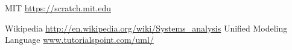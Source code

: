 \begin{thebibliography}{99999}
\singlespace\normalsize

 MIT \url{https://scratch.mit.edu}

 Wikipedia \url{http://en.wikipedia.org/wiki/Systems_analysis}
 Unified Modeling Language \url{www.tutorialspoint.com/uml/}

\end{thebibliography}
